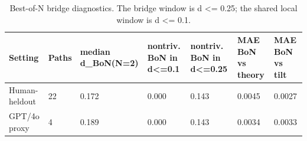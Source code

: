 \begin{table}[t]
\centering
\small
\begin{tabular}{lllllll}
\toprule
Setting & Paths & median d\_BoN(N=2) & nontriv. BoN in d<=0.1 & nontriv. BoN in d<=0.25 & MAE BoN vs theory & MAE BoN vs tilt \\
\midrule
Human-heldout & 22 & 0.172 & 0.000 & 0.143 & 0.0045 & 0.0027 \\
GPT/4o proxy & 4 & 0.189 & 0.000 & 0.143 & 0.0034 & 0.0033 \\
\bottomrule
\end{tabular}
\vspace{0.25em}
\caption{Best-of-N bridge diagnostics. The bridge window is d <= 0.25; the shared local window is d <= 0.1.}
\label{tab:bon-bridge}
\end{table}
